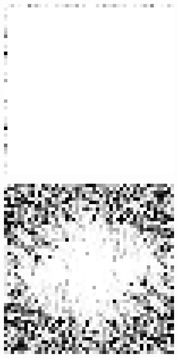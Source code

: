 \begin{figure}[htpb]
\centering
\begin{subfigure}{.25\textwidth}
\includegraphics[width=1\textwidth]{img/noiselessCPPsigma0}
\end{subfigure}%
\begin{subfigure}{.25\textwidth}
\includegraphics[width=1\textwidth]{img/noiselessCPPsigma75}

\end{subfigure}
\end{figure}

